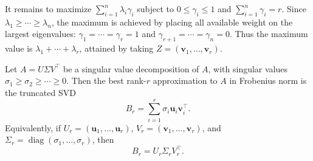 \begin{pfbox}
It remains to maximize
$\displaystyle\sum_{i=1}^n\lambda_i\gamma_i$ subject to
$0\le\gamma_i\le1$ and $\displaystyle\sum_{i=1}^n\gamma_i=r$.
Since $\lambda_1\ge\cdots\ge\lambda_n$, the maximum is achieved by placing all available weight on the largest eigenvalues:
$\gamma_1=\cdots=\gamma_r=1$ and
$\gamma_{r+1}=\cdots=\gamma_n=0$. Thus the maximum value is
$\lambda_1+\cdots+\lambda_r$, attained by taking
$Z=(\mathbf{v}_1,\ldots,\mathbf{v}_r)$.
\end{pfbox}

\begin{theorem}
Let $A=U\Sigma V^{\top}$ be a singular value decomposition of $A$, with singular values
$\sigma_1\ge\sigma_2\ge\cdots\ge 0$. Then the best rank-$r$ approximation to $A$ in Frobenius norm is the truncated SVD
\[
    B_r
    =
    \sum_{i=1}^r \sigma_i \mathbf{u}_i\mathbf{v}_i^{\top}.
\]
Equivalently, if $U_r=(\mathbf{u}_1,\ldots,\mathbf{u}_r)$, $V_r=(\mathbf{v}_1,\ldots,\mathbf{v}_r)$, and $\Sigma_r=\operatorname{diag}(\sigma_1,\ldots,\sigma_r)$, then
\[
    B_r=U_r\Sigma_rV_r^{\top}.
\]
\end{theorem}

